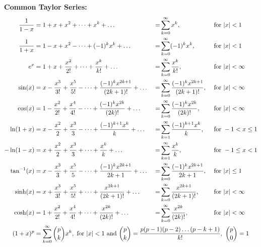 \documentclass[../mathNotesPreamble]{subfiles}
\begin{document}
    \noindent\textbf{Common Taylor Series:}
    \begingroup
      \addtolength{\jot}{0.675\baselineskip}
      \begin{alignat*}{4}
        \frac{1}{1-x}&= 1+x+x^2+\dots+x^k+\dots&=&\sum_{k=0}^\infty x^k,&&\textnormal{ for }\abs{x}<1\\
        \frac{1}{1+x}&= 1-x+x^2-\dots+(-1)^kx^k+\dots\ &=&\sum_{k=0}^\infty (-1)^k x^k,&&\textnormal{ for }\abs{x}<1\\
        e^x&=1+x+\frac{x^2}{2!}+\dots+\frac{x^k}{k!}+\dots\ &=&\sum_{k=0}^\infty \frac{x^k}{k!},&&\textnormal{ for }\abs{x}<\infty\\
        \sin(x)&=x-\frac{x^3}{3!}+\frac{x^5}{5!}-\dots+\frac{(-1)^k x^{2k+1}}{(2k+1)!}+\dots\ &=&\sum_{k=0}^\infty \frac{(-1)^k x^{2k+1}}{(2k+1)!},&&\textnormal{ for } \abs{x}<\infty\\
        \cos(x)&=1-\frac{x^2}{2!}+\frac{x^4}{4!}-\dots+\frac{(-1)^k x^{2k}}{(2k)!}+\dots\ &=&\sum_{k=0}^\infty \frac{(-1)^k x^{2k}}{(2k)!},&&\textnormal{ for } \abs{x}<\infty\\
        \ln(1+x)&=x-\frac{x^2}{2}+\frac{x^3}{3}-\dots+\frac{(-1)^{k+1}x^k}{k}+\dots\ &=&\sum_{k=1}^\infty \frac{(-1)^{k+1}x^k}{k},&&\textnormal{ for } -1<x\leq 1\\
        -\ln(1-x)&=x+\frac{x^2}{2}+\frac{x^3}{3}+\dots+\frac{x^k}{k}+\dots\ &=&\sum_{k=1}^\infty \frac{x^k}{k},&&\textnormal{ for } -1\leq x< 1\\
        \tan\inv(x)&=x-\frac{x^3}{3}+\frac{x^5}{5}-\dots+\frac{(-1)^k x^{2k+1}}{2k+1}+\dots\ &=&\sum_{k=0}^\infty \frac{(-1)^k x^{2k+1}}{2k+1},&&\textnormal{ for } \abs{x}\leq 1\\
        \sinh(x)&= x+\frac{x^3}{3!}+\frac{x^5}{5!}+\dots+ \frac{x^{2k+1}}{(2k+1)!}+\dots\ &=&\sum_{k=0}^\infty \frac{x^{2k+1}}{(2k+1)!},&&\textnormal{ for } \abs{x}<\infty\\
        \cosh(x)&= 1+\frac{x^2}{2!}+\frac{x^4}{4!}+\dots+ \frac{x^{2k}}{(2k)!}+\dots\ &=&\sum_{k=0}^\infty \frac{x^{2k}}{(2k)!},&&\textnormal{ for } \abs{x}<\infty\\
        (1+x)^p&=\sum_{k=0}^\infty {p\choose k} x^k, \textnormal{ for } \abs{x}<1 \textnormal{ and } \mathrlap{{p\choose k}=\frac{p(p-1)(p-2)\dots(p-k+1)}{k!},\ {p\choose 0}=1}
      \end{alignat*}
    \endgroup
    \pagebreak
\end{document}
